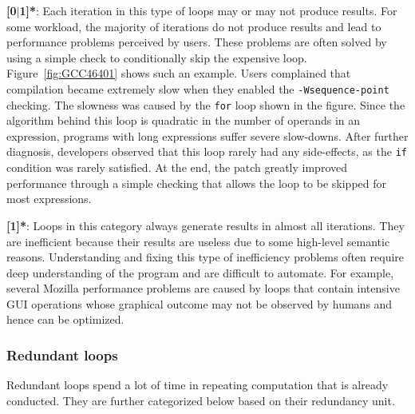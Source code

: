 {\textbf{[0$|$1]*}}:
Each iteration in this type of loops may or may not produce results.
For some workload, the majority of iterations do not produce
results and lead to performance problems perceived by users.
These problems are often solved
by using a simple check to conditionally skip the expensive loop.
Figure~\ref{fig:GCC46401} shows such an example.
Users complained that compilation became extremely slow when they 
enabled the \texttt{-Wsequence-point} checking.
The slowness was caused
by the \texttt{for} loop shown in the figure. Since the algorithm
behind this loop is quadratic in the number of operands in an expression, 
programs with long expressions suffer severe slow-downs.
After further diagnosis, developers observed that this loop rarely
had any side-effects, as the \texttt{if} condition was rarely satisfied.
At the end, the patch greatly improved performance through a
simple checking that allows the loop to be
skipped for most expressions.

\comment{
\textcolor{red}{ 
For example, a long expression inside the bug-triggering input exposes the super-linear 
inefficiency of checking violation of sequence point rule for GCC\#46401. 
Each operand on the expression will be compared with all previous operands on the same expression.
When fixing the bug,
developers notice that each operand on the buggy expression has a special feature which make the violation checking never 
report warning (generate results). 
The patch designed by developers is to add an extra condition checking to skip the violation checking for operands with that feature.    
}
}

{\textbf{[1]*}}:
Loops in this category always generate results in almost all iterations. 
They are inefficient because their results are useless due to
some high-level semantic reasons.
Understanding and fixing this type of inefficiency problems often require
deep understanding of the program and are difficult to automate.
For example, several Mozilla performance problems are caused by 
loops that contain intensive GUI operations whose graphical outcome may not
be observed by humans and hence can be optimized.

\subsubsection{Redundant loops}
Redundant loops spend a lot of time in repeating computation that is already
conducted. They are further categorized below based on their redundancy unit.


